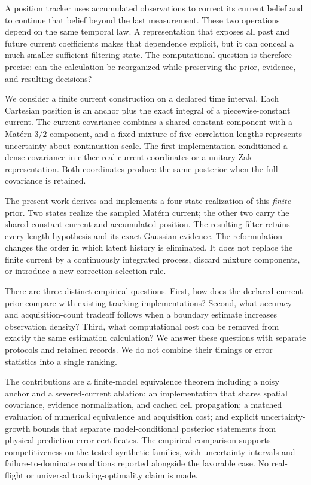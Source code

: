 \documentclass[journal]{IEEEtran}
\begin{document}
A position tracker uses accumulated observations to correct its current
belief and to continue that belief beyond the last measurement. These two
operations depend on the same temporal law. A representation that exposes
all past and future current coefficients makes that dependence explicit,
but it can conceal a much smaller sufficient filtering state. The
computational question is therefore precise: can the calculation be
reorganized while preserving the prior, evidence, and resulting decisions?

We consider a finite current construction on a declared time interval.
Each Cartesian position is an anchor plus the exact integral of a
piecewise-constant current. The current covariance combines a shared
constant component with a Mat\'ern-$3/2$ component, and a fixed mixture of
five correlation lengths represents uncertainty about continuation scale.
The first implementation conditioned a dense covariance in either real
current coordinates or a unitary Zak representation. Both coordinates
produce the same posterior when the full covariance is retained.

The present work derives and implements a four-state realization of this
\emph{finite} prior. Two states realize the sampled Mat\'ern current; the
other two carry the shared constant current and accumulated position.
The resulting filter retains every length hypothesis and its exact
Gaussian evidence. The reformulation changes the order in which latent
history is eliminated. It does not replace the finite current by a
continuously integrated process, discard mixture components, or introduce
a new correction-selection rule.

There are three distinct empirical questions. First, how does the declared
current prior compare with existing tracking implementations? Second,
what accuracy and acquisition-count tradeoff follows when a boundary
estimate increases observation density? Third, what computational cost
can be removed from exactly the same estimation calculation? We answer
these questions with separate protocols and retained records. We do not
combine their timings or error statistics into a single ranking.

The contributions are a finite-model equivalence theorem including a
noisy anchor and a severed-current ablation; an implementation that shares
spatial covariance, evidence normalization, and cached cell propagation;
a matched evaluation of numerical equivalence and acquisition cost; and
explicit uncertainty-growth bounds that separate model-conditional
posterior statements from physical prediction-error certificates.
The empirical comparison supports competitiveness on the tested
synthetic families, with uncertainty intervals and failure-to-dominate
conditions reported alongside the favorable case. No real-flight or
universal tracking-optimality claim is made.
\end{document}
